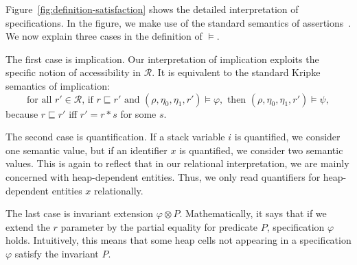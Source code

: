 \documentclass{LMCS}
\newcommand{\cR}{\mathcal{R}}
\begin{document}
Figure~\ref{fig:definition-satisfaction} shows
the detailed interpretation of specifications. 
In the figure, we make use of the standard semantics of 
assertions~\cite{reynolds02}.
We now explain three cases in the definition of $\models$.


The first case is implication.
Our interpretation of implication exploits the
specific notion of accessibility in $\cR$.  It is
equivalent to the standard Kripke semantics of implication:
$$
\mbox{for all $r' \in \cR$,
if $r \sqsubseteq r'$ and $(\rho,\eta_0,\eta_1,r') \models \varphi$}, 
\mbox{ then $(\rho,\eta_0,\eta_1,r') \models \psi$},
$$
because $r \sqsubseteq r'$ iff $r' = r*s$ for some $s$.

The second case is quantification. If a stack
variable $i$ is quantified, we consider one semantic value, but
if an identifier $x$ is quantified, we consider two semantic 
values. This is again to reflect that in
our relational interpretation, we are mainly concerned with 
heap-dependent entities. Thus, we only read quantifiers for 
heap-dependent entities $x$ relationally.

The last case is invariant extension 
$\varphi\otimes P$. Mathematically, it says that if we extend the 
$r$ parameter by the partial equality for
predicate $P$, specification $\varphi$ holds. Intuitively,
this means that some heap cells not appearing in a specification $\varphi$ 
satisfy the invariant $P$.
\end{document}
